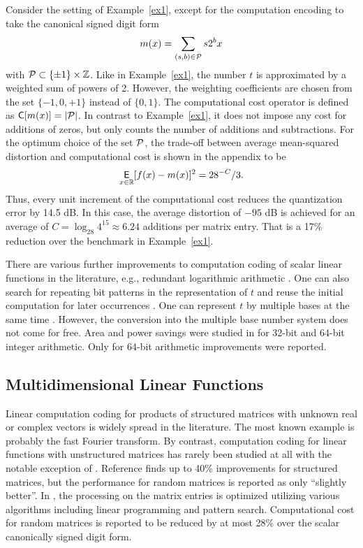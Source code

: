 \documentclass[twocolumn]{IEEEtran}
\def\expect{\mathop{\mbox{$\mathsf{E}$}}}
\begin{document}
\begin{example}
\label{ex2}
Consider the setting of Example~\ref{ex1}, except for the computation encoding to take the canonical signed digit form \cite{booth:51}
\begin{align}
m(x)= \sum\limits_{(s,b)\in{\cal P}}s2^b x 
\end{align}
with ${\cal P} \subset \{\pm 1\}\times \mathbb{Z}$. Like in Example~\ref{ex1}, the number $t$ is approximated by a weighted sum of powers of 2. However, the weighting coefficients are chosen from the set $\{-1,0,+1\}$ instead of $\{0,1\}$. The computational cost operator is defined as ${\mathsf C}[m(x)]=|{\cal P}|$. In contrast to Example~\ref{ex1}, it does not impose any cost for additions of zeros, but only counts the number of additions and subtractions. For the optimum choice of the set ${\cal P}$, the trade-off between average mean-squared distortion and computational cost is shown in the appendix to be
\begin{align}
\expect\limits_{x\in\R} [f(x)-m(x)]^2 =28^{-C}/3.
\end{align}
Thus, every unit increment of the computational cost reduces the quantization error by 14.5 dB. In this case, the average distortion of $-95$ dB is achieved for an average of $C=\log_{28} 4^{15}\approx 6.24$ additions per matrix entry. That is a 17\% reduction over the benchmark in Example~\ref{ex1}.
\end{example}

There are various further improvements to computation coding of scalar linear functions in the literature, e.g., redundant logarithmic arithmetic \cite{arnold:90,huang:94}.  One can also search for repeating bit patterns in the representation of $t$ and reuse the initial computation for later occurrences 
\cite{hartley:96, lefevre:00}. One can represent $t$ by multiple bases at the same time \cite{dimitrov:99}. However, the conversion into the multiple base number system does not come for free. Area and power savings were studied in \cite{dimitrov:11} for 32-bit and 64-bit integer arithmetic. Only for 64-bit arithmetic improvements were reported.


\subsection{Multidimensional Linear Functions}
\label{mullinfun}

Linear computation coding for products of structured matrices with unknown real or complex vectors is widely spread in the literature. The most known example is probably the fast Fourier transform. By contrast, computation coding for linear functions with unstructured matrices has rarely been studied at all with the notable exception of \cite{boullis:05,aksoy:16}. Reference \cite{boullis:05} finds up to 40\% improvements for structured matrices, but the performance for random matrices is reported as only ``slightly better''. In \cite{aksoy:16}, the processing on the matrix entries is optimized utilizing various algorithms including linear programming and pattern search. Computational cost for random matrices is reported to be reduced by at most 28\% over the scalar canonically signed digit form.
\end{document}
